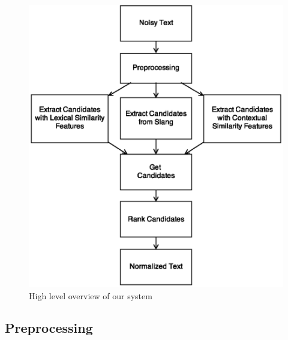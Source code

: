\documentclass[preprint,review,12pt]{elsarticle}
\begin{document}
\begin{figure}[htb]
\begin{center}
\includegraphics[scale=0.6]{fig/overview}
\caption{High level overview of our system}
\label{fig:overview}
\end{center}
\end{figure}

\subsection{Preprocessing}

\end{document}

